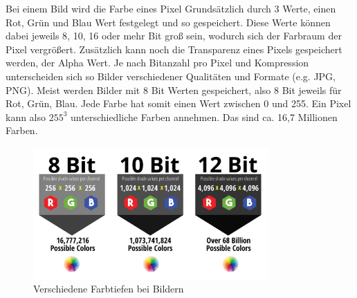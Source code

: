 Bei einem Bild wird die Farbe eines Pixel Grundsätzlich durch 3 Werte, einen Rot,
Grün und Blau Wert festgelegt und so gespeichert. Diese Werte können dabei jeweils
8, 10, 16 oder mehr Bit groß sein, wodurch sich der Farbraum der Pixel vergrößert.
Zusätzlich kann noch die Transparenz eines Pixels gespeichert werden, der Alpha Wert.
Je nach Bitanzahl pro Pixel und Kompression unterscheiden sich so Bilder verschiedener
Qualitäten und Formate (e.g. JPG, PNG). Meist werden Bilder mit 8 Bit Werten gespeichert,
also 8 Bit jeweils für Rot, Grün, Blau. Jede Farbe hat somit einen Wert zwischen 0 und 255.
Ein Pixel kann also $255^3$ unterschiedliche Farben annehmen. Das sind ca. 16,7 Millionen
Farben.

\begin{figure}[H]
    \centering
    \includegraphics[width=0.8\textwidth]{images/rgbvalues.png}
    \caption{Verschiedene Farbtiefen bei Bildern}
\end{figure}

